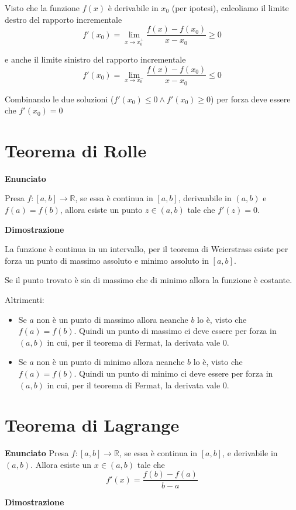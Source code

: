 Visto che la funzione $f(x)$ è derivabile in $x_0$ (per ipotesi), calcoliamo il limite destro del rapporto incrementale $$f'(x_0) = \lim_{x\to x^+_0}\frac{f(x)-f(x_0)}{x-x_0} \geq 0$$

e anche il limite sinistro del rapporto incrementale $$f'(x_0) = \lim_{x\to x^-_0}\frac{f(x)-f(x_0)}{x-x_0} \leq 0$$

Combinando le due soluzioni ($f'(x_0)\leq 0 \land f'(x_0)\geq 0$) per forza deve essere che $f'(x_0)=0$


\section{Teorema di Rolle}

\textbf{Enunciato}

Presa $f: [a,b] \to \mathbb{R}$, se essa è continua in $[a,b]$, derivanbile in $(a,b)$ e $f(a)=f(b)$, allora esiste un punto $z \in (a,b)$ tale che $f'(z)=0$.

\textbf{Dimostrazione}

La funzione è continua in un intervallo, per il teorema di Weierstrass esiste per forza un punto di massimo assoluto e minimo assoluto in $[a,b]$.   

Se il punto trovato è sia di massimo che di minimo allora la funzione è costante.

Altrimenti:

\begin{itemize}
\item Se $a$ non è un punto di massimo allora neanche $b$ lo è, visto che $f(a)=f(b)$. Quindi un punto di massimo ci deve essere per forza in $(a,b)$ in cui, per il teorema di Fermat, la derivata vale 0.

\item Se $a$ non è un punto di minimo allora neanche $b$ lo è, visto che $f(a)=f(b)$. Quindi un punto di minimo ci deve essere per forza in $(a,b)$ in cui, per il teorema di Fermat, la derivata vale 0.
\end{itemize}


\section{Teorema di Lagrange}

\textbf{Enunciato}
Presa $f: [a,b] \to \mathbb{R}$, se essa è continua in $[a,b]$, e derivabile in $(a,b)$. Allora esiste un $x \in (a,b)$ tale che $$f'(x)=\frac{f(b)-f(a)}{b-a}$$

\textbf{Dimostrazione}

